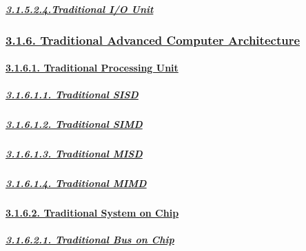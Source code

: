 \documentclass[
]{article}
\begin{document}
\hypertarget{traditional-io-unit-1}{%
\subparagraph{\texorpdfstring{\protect\hyperlink{traditional-io-unit-3}{3.1.5.2.4.Traditional
I/O
Unit}}{3.1.5.2.4.Traditional I/O Unit}}\label{traditional-io-unit-1}}

\hypertarget{traditional-advanced-computer-architecture}{%
\subsubsection{\texorpdfstring{\protect\hyperlink{traditional-advanced-computer-architecture-1}{3.1.6.
Traditional Advanced Computer
Architecture}}{3.1.6. Traditional Advanced Computer Architecture}}\label{traditional-advanced-computer-architecture}}

\hypertarget{traditional-processing-unit}{%
\paragraph{\texorpdfstring{\protect\hyperlink{traditional-processing-unit-1}{3.1.6.1.
Traditional Processing
Unit}}{3.1.6.1. Traditional Processing Unit}}\label{traditional-processing-unit}}

\hypertarget{traditional-sisd}{%
\subparagraph{\texorpdfstring{\protect\hyperlink{traditional-sisd-1}{3.1.6.1.1.
Traditional
SISD}}{3.1.6.1.1. Traditional SISD}}\label{traditional-sisd}}

\hypertarget{traditional-simd}{%
\subparagraph{\texorpdfstring{\protect\hyperlink{traditional-simd-1}{3.1.6.1.2.
Traditional
SIMD}}{3.1.6.1.2. Traditional SIMD}}\label{traditional-simd}}

\hypertarget{traditional-misd}{%
\subparagraph{\texorpdfstring{\protect\hyperlink{traditional-misd-1}{3.1.6.1.3.
Traditional
MISD}}{3.1.6.1.3. Traditional MISD}}\label{traditional-misd}}

\hypertarget{traditional-mimd}{%
\subparagraph{\texorpdfstring{\protect\hyperlink{traditional-mimd-1}{3.1.6.1.4.
Traditional
MIMD}}{3.1.6.1.4. Traditional MIMD}}\label{traditional-mimd}}

\hypertarget{traditional-system-on-chip}{%
\paragraph{\texorpdfstring{\protect\hyperlink{traditional-system-on-chip-1}{3.1.6.2.
Traditional System on
Chip}}{3.1.6.2. Traditional System on Chip}}\label{traditional-system-on-chip}}

\hypertarget{traditional-bus-on-chip}{%
\subparagraph{\texorpdfstring{\protect\hyperlink{traditional-bus-on-chip-1}{3.1.6.2.1.
Traditional Bus on
Chip}}{3.1.6.2.1. Traditional Bus on Chip}}\label{traditional-bus-on-chip}}
\end{document}
